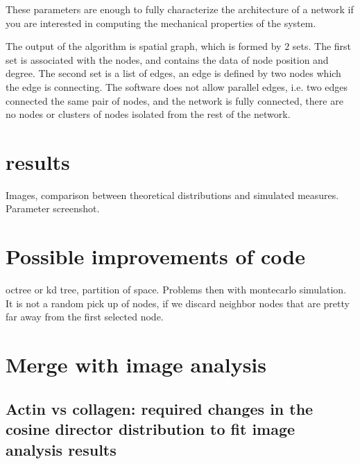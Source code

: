 These parameters are enough to fully characterize the architecture of a
network if you are interested in computing the
mechanical properties of the system.

The output of the algorithm is spatial \gls{graph}, which is formed by $2$
sets. The first set is associated with the nodes, and contains the data of node
position and degree. The second set is a list of edges, an edge is defined
by two nodes which the edge is connecting. The software does not allow parallel
edges, i.e. two edges connected the same pair of nodes, and the network is fully
connected, there are no nodes or clusters of nodes isolated from the rest of the
network.

\section{results}
Images, comparison between theoretical distributions and simulated measures.
Parameter screenshot.

\section{Possible improvements of code}
octree or kd tree, partition of space. Problems then with montecarlo simulation.
It is not a random pick up of nodes, if we discard neighbor nodes that are
pretty far away from the first selected node.

\section{Merge with image analysis}
\subsection{Actin vs collagen: required changes in the cosine director
distribution to fit image analysis results}
